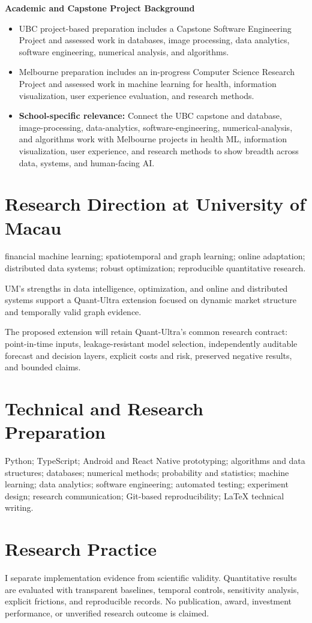 \documentclass[11pt]{article}
\begin{document}
\textbf{Academic and Capstone Project Background}
\begin{itemize}
\item UBC project-based preparation includes a Capstone Software Engineering Project and assessed work in databases, image processing, data analytics, software engineering, numerical analysis, and algorithms.
\item Melbourne preparation includes an in-progress Computer Science Research Project and assessed work in machine learning for health, information visualization, user experience evaluation, and research methods.
\item \textbf{School-specific relevance:} Connect the UBC capstone and database, image-processing, data-analytics, software-engineering, numerical-analysis, and algorithms work with Melbourne projects in health ML, information visualization, user experience, and research methods to show breadth across data, systems, and human-facing AI.
\end{itemize}

\section*{Research Direction at University of Macau}
financial machine learning; spatiotemporal and graph learning; online adaptation; distributed data systems; robust optimization; reproducible quantitative research.

UM's strengths in data intelligence, optimization, and online and distributed systems support a Quant-Ultra extension focused on dynamic market structure and temporally valid graph evidence.

The proposed extension will retain Quant-Ultra's common research contract: point-in-time inputs, leakage-resistant model selection, independently auditable forecast and decision layers, explicit costs and risk, preserved negative results, and bounded claims.

\section*{Technical and Research Preparation}
Python; TypeScript; Android and React Native prototyping; algorithms and data structures; databases; numerical methods; probability and statistics; machine learning; data analytics; software engineering; automated testing; experiment design; research communication; Git-based reproducibility; LaTeX technical writing.

\section*{Research Practice}
I separate implementation evidence from scientific validity. Quantitative results are evaluated with transparent baselines, temporal controls, sensitivity analysis, explicit frictions, and reproducible records. No publication, award, investment performance, or unverified research outcome is claimed.
\end{document}
